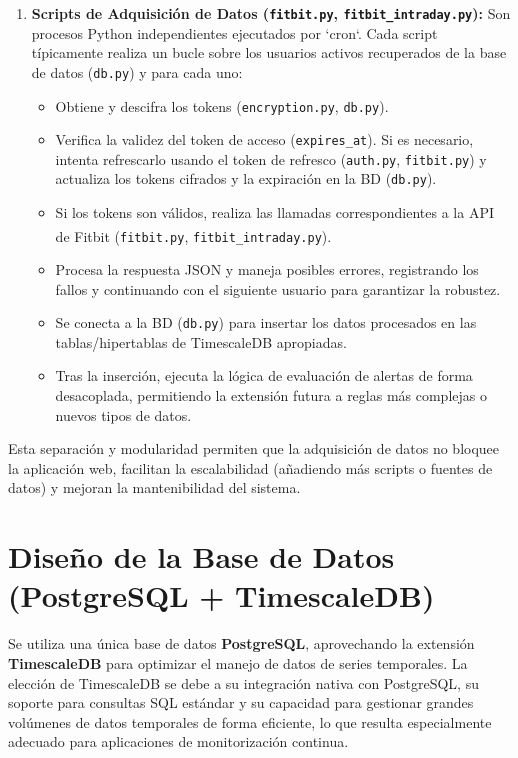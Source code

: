 \begin{enumerate}
    \item \textbf{Scripts de Adquisición de Datos (\texttt{fitbit.py}, \texttt{fitbit\_intraday.py}):} Son procesos Python independientes ejecutados por `cron`. Cada script típicamente realiza un bucle sobre los usuarios activos recuperados de la base de datos (\texttt{db.py}) y para cada uno:
        \begin{itemize}
            \item Obtiene y descifra los tokens (\texttt{encryption.py}, \texttt{db.py}).
            \item Verifica la validez del token de acceso (\texttt{expires\_at}). Si es necesario, intenta refrescarlo usando el token de refresco (\texttt{auth.py}, \texttt{fitbit.py}) y actualiza los tokens cifrados y la expiración en la BD (\texttt{db.py}).
            \item Si los tokens son válidos, realiza las llamadas correspondientes a la API de Fitbit\textsuperscript{\textregistered} (\texttt{fitbit.py}, \texttt{fitbit\_intraday.py}).
            \item Procesa la respuesta JSON y maneja posibles errores, registrando los fallos y continuando con el siguiente usuario para garantizar la robustez.
            \item Se conecta a la BD (\texttt{db.py}) para insertar los datos procesados en las tablas/hipertablas de TimescaleDB apropiadas.
            \item Tras la inserción, ejecuta la lógica de evaluación de alertas de forma desacoplada, permitiendo la extensión futura a reglas más complejas o nuevos tipos de datos.
        \end{itemize}
\end{enumerate}
Esta separación y modularidad permiten que la adquisición de datos no bloquee la aplicación web, facilitan la escalabilidad (añadiendo más scripts o fuentes de datos) y mejoran la mantenibilidad del sistema.

\section{Diseño de la Base de Datos (PostgreSQL + TimescaleDB)}
\label{sec:diseno_bd}

Se utiliza una única base de datos \textbf{PostgreSQL}, aprovechando la extensión \textbf{TimescaleDB} para optimizar el manejo de datos de series temporales. La elección de TimescaleDB se debe a su integración nativa con PostgreSQL, su soporte para consultas SQL estándar y su capacidad para gestionar grandes volúmenes de datos temporales de forma eficiente, lo que resulta especialmente adecuado para aplicaciones de monitorización continua.

